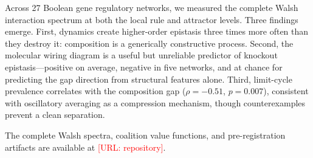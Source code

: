 \documentclass[11pt]{article}
\begin{document}
Across 27 Boolean gene regulatory networks, we measured the complete
Walsh interaction spectrum at both the local rule and attractor
levels. Three findings emerge. First, dynamics create higher-order
epistasis three times more often than they destroy it: composition
is a generically constructive process. Second, the molecular wiring
diagram is a useful but unreliable predictor of knockout
epistasis---positive on average, negative in five networks, and at
chance for predicting the gap direction from structural features
alone. Third, limit-cycle prevalence correlates with the composition
gap ($\rho = -0.51$, $p = 0.007$), consistent with oscillatory
averaging as a compression mechanism, though counterexamples prevent
a clean separation.

The complete Walsh spectra, coalition value functions, and
pre-registration artifacts are available at
\textcolor{red}{[URL: repository]}.




% 
\end{document}
